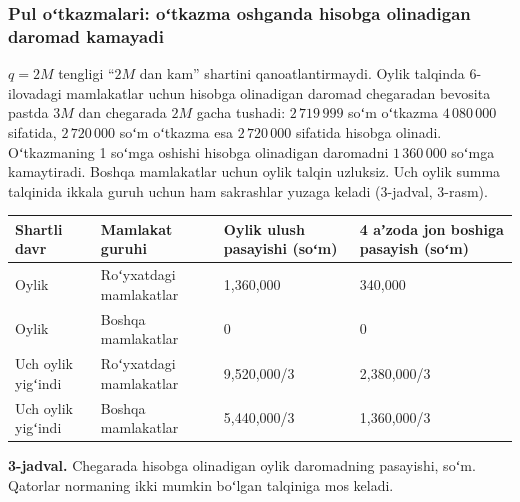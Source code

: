 \documentclass[14pt,a4paper]{extarticle}
\begin{document}
\subsubsection{Pul oʻtkazmalari: oʻtkazma oshganda hisobga olinadigan daromad kamayadi}\label{res:rem}
$q=2M$ tengligi “$2M$ dan kam” shartini qanoatlantirmaydi. Oylik talqinda 6-ilovadagi mamlakatlar uchun hisobga olinadigan daromad chegaradan bevosita pastda $3M$ dan chegarada $2M$ gacha tushadi: $2\,719\,999$ soʻm oʻtkazma $4\,080\,000$ sifatida, $2\,720\,000$ soʻm oʻtkazma esa $2\,720\,000$ sifatida hisobga olinadi. Oʻtkazmaning 1 soʻmga oshishi hisobga olinadigan daromadni $1\,360\,000$ soʻmga kamaytiradi. Boshqa mamlakatlar uchun oylik talqin uzluksiz. Uch oylik summa talqinida ikkala guruh uchun ham sakrashlar yuzaga keladi (3-jadval, 3-rasm).

\begingroup\fontsize{11bp}{13.2bp}\selectfont
\begin{longtable}{p{} p{} p{} p{}}
\toprule
Shartli davr & Mamlakat guruhi & Oylik ulush pasayishi (soʻm) & 4 aʼzoda jon boshiga pasayish (soʻm) \\
\midrule
\endhead
Oylik & Roʻyxatdagi mamlakatlar & 1,360,000 & 340,000 \\
Oylik & Boshqa mamlakatlar & 0 & 0 \\
Uch oylik yigʻindi & Roʻyxatdagi mamlakatlar & 9,520,000/3 & 2,380,000/3 \\
Uch oylik yigʻindi & Boshqa mamlakatlar & 5,440,000/3 & 1,360,000/3 \\
\bottomrule
\end{longtable}
\endgroup
\textbf{3-jadval.} Chegarada hisobga olinadigan oylik daromadning pasayishi, soʻm. Qatorlar normaning ikki mumkin boʻlgan talqiniga mos keladi.
\end{document}
